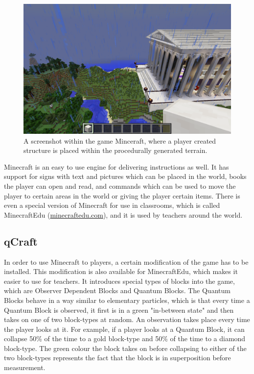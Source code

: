 \documentclass[11pt,twoside]{report} %
\begin{document}
\begin{figure}[h]
\centering
\includegraphics[width=\textwidth]{screenshot}
\caption{A screenshot within the game Minceraft, where a player created structure is placed within the procedurally generated terrain.\label{fig:screenshot}}
\end{figure}

Minecraft is an easy to use engine for delivering instructions as well. It has support for signs with text and pictures which can be placed in the world, books the player can open and read, and commands which can be used to move the player to certain areas in the world or giving the player certain items. There is even a special version of Minecraft for use in classrooms, which is called MinecraftEdu (\url{minecraftedu.com}), and it is used by teachers around the world.

\subsection{qCraft}

In order to use Minecraft to players, a certain modification of the game has to be installed. This modification is also available for MinecraftEdu, which makes it easier to use for teachers. It introduces special types of blocks into the game, which are Observer Dependent Blocks and Quantum Blocks. The Quantum Blocks behave in a way similar to elementary particles, which is that every time a Quantum Block is observed, it first is in a green "in-between state" and then takes on one of two block-types at random. An observation takes place every time the player looks at it. For example, if a player looks at a Quantum Block, it can collapse 50\% of the time to a gold block-type and 50\% of the time to a diamond block-type. The green colour the block takes on before collapsing to either of the two block-types represents the fact that the block is in superposition before measurement.
\end{document}
